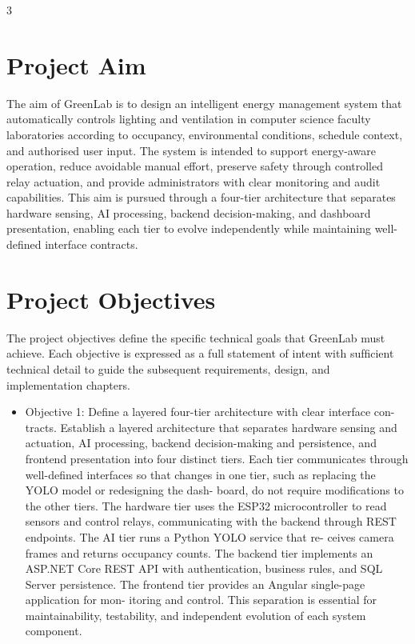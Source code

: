 3



\section{Project Aim}


The aim of GreenLab is to design an intelligent energy management system that automatically controls lighting and ventilation in computer science faculty laboratories according to
occupancy, environmental conditions, schedule context, and authorised user input. The system is intended to support energy-aware operation, reduce avoidable manual effort, preserve
safety through controlled relay actuation, and provide administrators with clear monitoring
and audit capabilities. This aim is pursued through a four-tier architecture that separates
hardware sensing, AI processing, backend decision-making, and dashboard presentation,
enabling each tier to evolve independently while maintaining well-deﬁned interface contracts.



\section{Project Objectives}


The project objectives deﬁne the speciﬁc technical goals that GreenLab must achieve. Each
objective is expressed as a full statement of intent with sufﬁcient technical detail to guide
the subsequent requirements, design, and implementation chapters.


\begin{itemize}
  \item Objective 1: Deﬁne a layered four-tier architecture with clear interface con-
tracts. Establish a layered architecture that separates hardware sensing and actuation,
AI processing, backend decision-making and persistence, and frontend presentation
into four distinct tiers. Each tier communicates through well-deﬁned interfaces so
that changes in one tier, such as replacing the YOLO model or redesigning the dash-
board, do not require modiﬁcations to the other tiers. The hardware tier uses the
ESP32 microcontroller to read sensors and control relays, communicating with the
backend through REST endpoints. The AI tier runs a Python YOLO service that re-
ceives camera frames and returns occupancy counts. The backend tier implements
an ASP.NET Core REST API with authentication, business rules, and SQL Server
persistence. The frontend tier provides an Angular single-page application for mon-
itoring and control. This separation is essential for maintainability, testability, and
independent evolution of each system component.
\end{itemize}

